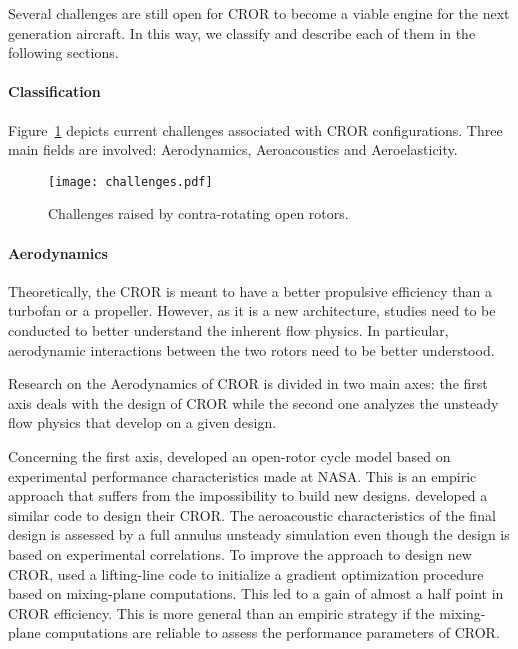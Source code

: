 
Several challenges are still open for CROR
to become a viable engine for the next generation aircraft.
In this way, we classify and describe each of them in the following sections.

\paragraph{Classification}
Figure~\ref{fig:cror_challenges} depicts current challenges associated
with CROR configurations. Three main fields are involved: Aerodynamics,
Aeroacoustics and Aeroelasticity.
\begin{figure}[htp]
  \centering
  \texttt{[image: challenges.pdf]}
  \caption{Challenges raised by contra-rotating open rotors.}
  \label{fig:cror_challenges}
\end{figure}

\paragraph{Aerodynamics}
Theoretically, 
the CROR is meant to have a better propulsive efficiency than a turbofan or a
propeller. However, as it is a new architecture, studies need to be conducted
to better understand the inherent flow physics. In particular,
aerodynamic interactions between the two rotors need to be better understood.

Research on the Aerodynamics of CROR is divided in two main
axes: the first axis deals with the design of CROR while the second
one analyzes the unsteady flow physics that develop on a given design.

Concerning the first axis, 
\citet{Hendricks2011} developed an open-rotor cycle model based
on experimental performance characteristics made at NASA. This is 
an empiric approach that suffers from the impossibility to build new designs.
\citet{Peters2012} developed a similar code to design their CROR. The aeroacoustic
characteristics of the final design is assessed by a 
full annulus unsteady simulation even though the design is 
based on experimental correlations.
To improve the approach to design new CROR, 
\citet{Bechet2011} used a lifting-line code to
initialize a gradient optimization procedure based on mixing-plane
computations. This led to a gain of almost a half point
in CROR efficiency. This is more general than an empiric strategy
if the mixing-plane computations are reliable to assess the performance
parameters of CROR. 

